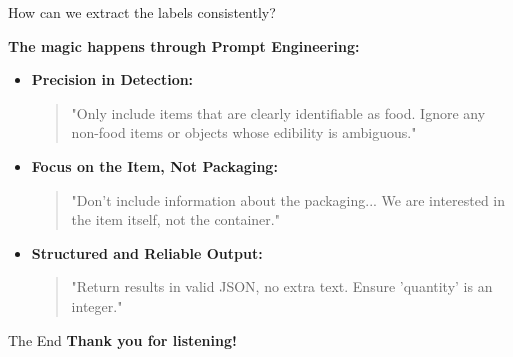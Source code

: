\documentclass{beamer}
\begin{document}
\begin{frame}{How can we extract the labels consistently?}
    \begin{block}{\textbf{The magic happens through Prompt Engineering:}}
        \begin{itemize}
            \item \textbf{Precision in Detection:}
            \begin{quote}
                \vspace{0.2cm}
                "Only include items that are clearly identifiable as food. Ignore any non-food items or objects whose edibility is ambiguous."
            \end{quote}
            \item \textbf{Focus on the Item, Not Packaging:}
            \begin{quote}
                \vspace{0.2cm}
                "Don't include information about the packaging... We are interested in the item itself, not the container."
            \end{quote}
            \item \textbf{Structured and Reliable Output:}
            \begin{quote}
                \vspace{0.2cm}
                "Return results in valid JSON, no extra text. Ensure 'quantity' is an integer."
            \end{quote}
        \end{itemize}
    \end{block}
\end{frame}

\begin{frame}{The End}
    \textbf{Thank you for listening!}
\end{frame}
\end{document}
